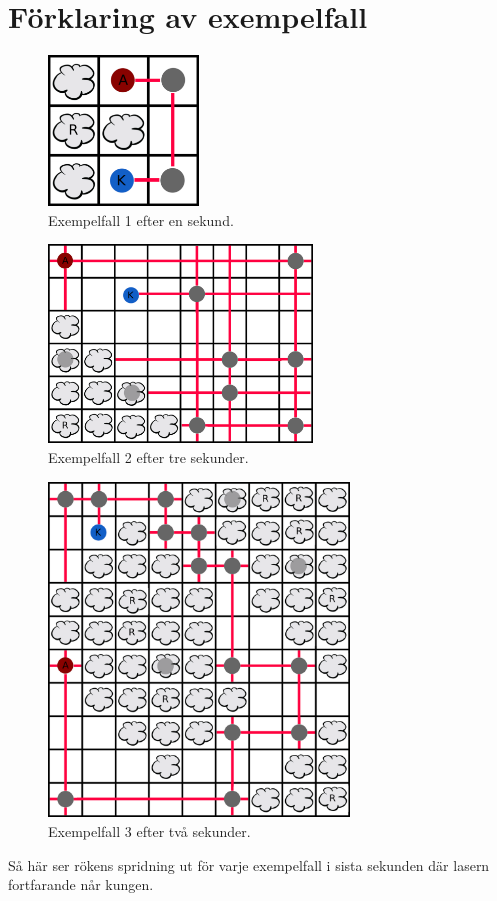 \section*{Förklaring av exempelfall}
\begin{figure}[!h]
\centering
  \includegraphics[width=4cm]{sample1.png}
  \caption{Exempelfall 1 efter en sekund.}
\end{figure}
\begin{figure}[!h]
  \centering
  \includegraphics[width=7cm]{sample2.png}
  \caption{Exempelfall 2 efter tre sekunder.}
\end{figure}
\begin{figure}[!h]
  \centering
  \includegraphics[width=8cm]{sample3.png}
  \caption{Exempelfall 3 efter två sekunder.}
\end{figure}

Så här ser rökens spridning ut för varje exempelfall i sista sekunden där lasern fortfarande når kungen.
